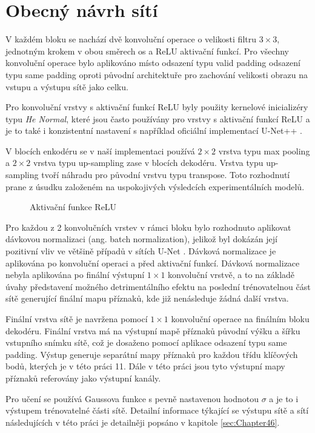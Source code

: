\section{Obecný návrh sítí}
\label{sec:Chapter42}
V každém bloku se nachází dvě konvoluční operace o velikosti filtru $3\times3$, jednotným krokem v obou směrech os a ReLU aktivační funkcí. Pro všechny konvoluční operace bylo aplikováno místo odsazení typu valid padding odsazení typu same padding oproti původní architektuře \cite{unet} pro zachování velikosti obrazu na vstupu a výstupu sítě jako celku.

Pro konvoluční vrstvy s aktivační funkcí ReLU byly použity kernelové inicializéry typu \textit{He Normal}, které jsou často používány pro vrstvy s aktivační funkcí ReLU \cite{relu_henormal} a je to také i konzistentní nastavení s například oficiální implementací U-Net++ \cite{unetpp_github}. 

V blocích enkodéru se v naší implementaci používá $2\times2$ vrstva typu max pooling a $2\times2$ vrstva typu up-sampling zase v blocích dekodéru. Vrstva typu up-sampling tvoří náhradu pro původní vrstvu typu transpose. Toto rozhodnutí prane z úsudku založeném na uspokojivých výsledcích experimentálních modelů. 

\begin{figure}[ht]
    \centering
    \caption[Aktivační funkce ReLU]{Aktivační funkce ReLU}
    \label{fig:relu}
\end{figure}

Pro každou z 2 konvolučních vrstev v rámci bloku bylo rozhodnuto aplikovat dávkovou normalizaci (ang. batch normalization), jelikož byl dokázán její pozitivní vliv ve většině případů v sítích U-Net \cite{unetnormalization}. Dávková normalizace je aplikována po konvoluční operaci a před aktivační funkcí. Dávková normalizace nebyla aplikována po finální výstupní $1\times1$ konvoluční vrstvě, a to na základě úvahy představení možného detrimentálního efektu na poslední trénovatelnou část sítě generující finální mapu příznaků, kde již nenásleduje žádná další vrstva.

Finální vrstva sítě je navržena pomocí $1\times1$ konvoluční operace na finálním bloku dekodéru. Finální vrstva má na výstupní mapě příznaků původní výšku a šířku vstupního snímku sítě, což je dosaženo pomocí aplikace odsazení typu same padding. Výstup generuje separátní mapy příznaků pro každou třídu klíčových bodů, kterých je v této práci 11. Dále v této práci jsou tyto výstupní mapy příznaků referovány jako výstupní kanály.

Pro učení se používá Gaussova funkce s pevně nastavenou hodnotou $\sigma$ a je to i výstupem trénovatelné části sítě. Detailní informace týkající se výstupu sítě a sítí následujících v této práci je detailněji popsáno v kapitole \ref{sec:Chapter46}.
\endinput